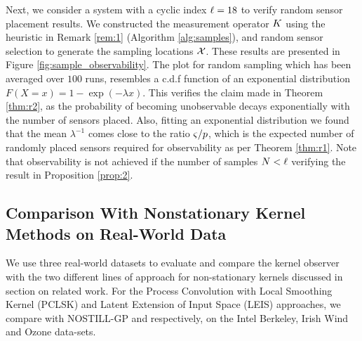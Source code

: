 Next, we  consider a system with a cyclic index $\ell=18$ to verify random sensor placement results. We constructed the measurement operator $K$ using the heuristic in Remark \ref{rem:1} (Algorithm \ref{alg:samples}), and random sensor selection to generate the sampling locations $\mathcal{X}$. These results are presented in Figure \ref{fig:sample_observability}. The plot for random sampling which has been averaged over $ 100 $ runs, resembles a c.d.f function of an exponential distribution $ F(X=x)=1-\exp(-\lambda x) $. This verifies the claim made in Theorem \ref{thm:r2}, as the probability of becoming unobservable decays exponentially with the number of sensors placed. Also, fitting an exponential distribution we found that the mean $ \lambda^{-1}$ comes close to the ratio $ {\varsigma}/{p} $, which is the expected number of randomly placed sensors required for observability as per Theorem \ref{thm:r1}. Note that observability is not achieved if the number of samples $N < \ell$ verifying the result in Proposition \ref{prop:2}. %
 \vspace{-0.1in}
\subsection{Comparison With Nonstationary Kernel Methods on Real-World Data}\label{sec:comparison}
We use three real-world datasets to evaluate and compare the kernel observer with the two different lines of approach for non-stationary kernels  discussed in section on related work. %
For the Process Convolution with Local Smoothing Kernel (PCLSK) and Latent Extension of Input Space (LEIS) approaches, we compare with NOSTILL-GP \cite{garg2012AAAI} and \cite{pfingsten2006nonstationary} respectively, on the Intel Berkeley, Irish Wind and Ozone data-sets. 

